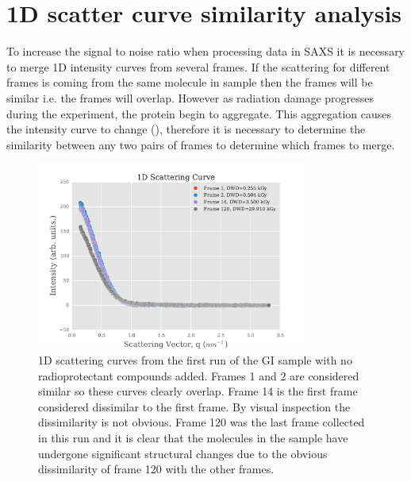 \section{1D scatter curve similarity analysis}
\label{sec:1D scatter curve similarity analysis}
To increase the signal to noise ratio when processing data in SAXS it is necessary to merge 1D intensity curves from several frames.
If the scattering for different frames is coming from the same molecule in sample then the frames will be similar i.e. the frames will overlap.
However as radiation damage progresses during the experiment, the protein begin to aggregate.
This aggregation causes the intensity curve to change (), therefore it is necessary to determine the similarity between any two pairs of frames to determine which frames to merge.
\begin{figure}
    \centering
    \includegraphics[width=0.8\textwidth]{figures/saxs/scatter_curves.pdf}
    \caption{1D scattering curves from the first run of the GI sample with no radioprotectant compounds added. Frames 1 and 2 are considered similar so these curves clearly overlap. Frame 14 is the first frame considered dissimilar to the first frame. By visual inspection the dissimilarity is not obvious. Frame 120 was the last frame collected in this run and it is clear that the molecules in the sample have undergone significant structural changes due to the obvious dissimilarity of frame 120 with the other frames.}
    \label{fig:1D Scatter Curves}
\end{figure}

